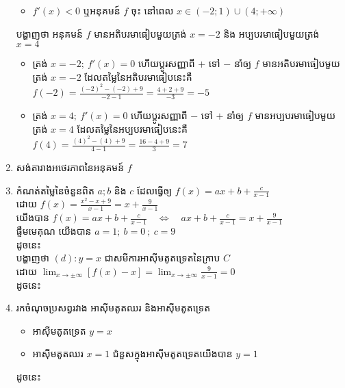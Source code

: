 \documentclass[expologarit]{subfiles}
\begin{document}
\begin{enumerate}[k]
\begin{itemize}
\item $f'(x)<0$ ឬអនុគមន៍ $f$ ចុះ នៅពេល $x\in\left(-2;1\right)\cup (4;+\infty)$
\end{itemize}
 បង្ហាញថា អនុគមន៍ $f$ មានអតិបរមាធៀបមួយត្រង់ $x=-2$ និង អប្បបរមាធៀបមួយត្រង់ $x=4$ 
 \begin{itemize}
 \item ត្រង់ $x=-2;\ f'(x)=0$ ហើយប្តូរសញ្ញាពី $+$ ទៅ $-$ នាំឲ្យ $f$ មានអតិបរមាធៀបមួយត្រង់ $x=-2$ ដែលតម្លៃនៃអតិបរមាធៀបនេះគឺ $f(-2)=\frac{(-2)^2-(-2)+9}{-2-1}=\frac{4+2+9}{-3}=-5$
 \item ត្រង់ $x=4;\ f'(x)=0$ ហើយប្តូរសញ្ញាពី $-$ ទៅ $+$ នាំឲ្យ $f$ មានអប្បបរមាធៀបមួយត្រង់ $x=4$ ដែលតម្លៃនៃអប្បបរមាធៀបនេះគឺ $f(4)=\frac{(4)^2-(4)+9}{4-1}=\frac{16-4+9}{3}=7$
 \end{itemize}
 \newpage 
\item សង់តារាងអថេរភាពនៃអនុគមន៍ $f$ 
\\[0.2cm]
\item កំណត់តម្លៃនៃចំនួនពិត $a;b$ និង $c$ ដែលធ្វើឲ្យ $f(x)=ax+b+\frac{c}{x-1}$
\\
ដោយ $f(x)=\frac{x^2-x+9}{x-1}=x+\frac{9}{x-1}$\\
យើងបាន $f(x)=ax+b+\frac{c}{x-1}\quad \Leftrightarrow\quad ax+b+\frac{c}{x-1}=x+\frac{9}{x-1}$\\
ផ្ទឹមមេគុណ យើងបាន $a=1;\ b=0\ ;\ c=9$\\[0.25cm]
ដូចនេះ 
\\[0.25cm]
 បង្ហាញថា $(d): y=x$  ជាសមីការអាស៊ីមតូតទ្រេតនៃក្រាប $C$
 \\[0.25cm]
 ដោយ $\lim_{x\to \pm\infty}[f(x)-x]=\lim_{x\to \pm\infty}\frac{9}{x-1}=0$\\[0.25cm]
 ដូចនេះ 
\item រកចំណុចប្រសព្វរវាង អាស៊ីមតូតឈរ និងអាស៊ីមតូតទ្រេត
\begin{itemize}
\item អាស៊ីមតូតទ្រេត $y=x$
\item អាស៊ីមតូតឈរ $x=1$ ជំនួសក្នុងអាស៊ីមតូតទ្រេតយើងបាន $y=1$
\end{itemize}
ដូចនេះ \\[0.25cm]

\end{enumerate}
\end{document}
